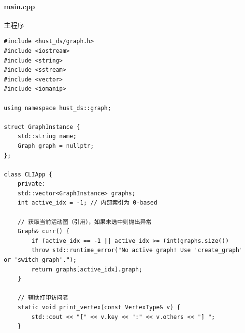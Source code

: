 \documentclass[supercite]{Experimental_Report}
\theoremstyle{definition}
\begin{document}
\paragraph{main.cpp} 主程序
\begin{lstlisting}
#include <hust_ds/graph.h>
#include <iostream>
#include <string>
#include <sstream>
#include <vector>
#include <iomanip>

using namespace hust_ds::graph;

struct GraphInstance {
	std::string name;
	Graph graph = nullptr;
};

class CLIApp {
	private:
	std::vector<GraphInstance> graphs;
	int active_idx = -1; // 内部索引为 0-based
	
	// 获取当前活动图（引用），如果未选中则抛出异常
	Graph& curr() {
		if (active_idx == -1 || active_idx >= (int)graphs.size())
		throw std::runtime_error("No active graph! Use 'create_graph' or 'switch_graph'.");
		return graphs[active_idx].graph;
	}
	
	// 辅助打印访问者
	static void print_vertex(const VertexType& v) {
		std::cout << "[" << v.key << ":" << v.others << "] ";
	}
	

\end{lstlisting}
\end{document}
